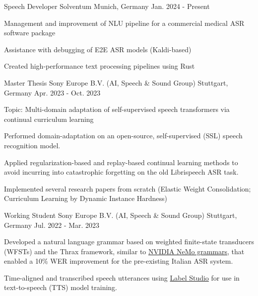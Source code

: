

\begin{cventries}

  \cventry
    {Speech Developer}
    {Solventum} %
    {Munich, Germany} %
    {Jan. 2024 - Present} %
    {
      \begin{cvitems} %
        \item Management and improvement of NLU pipeline for a commercial medical ASR software package
        \item Assistance with debugging of E2E ASR models (Kaldi-based)
        \item Created high-performance text processing pipelines using Rust
      \end{cvitems}
    }
  \cventry
    {Master Thesis}
    {Sony Europe B.V. (AI, Speech \& Sound Group)} %
    {Stuttgart, Germany} %
    {Apr. 2023 - Oct. 2023} %
    {
      \begin{cvitems} %
        \item Topic: Multi-domain adaptation of self-supervised speech transformers via continual curriculum learning %
        \item Performed domain-adaptation on an open-source, self-supervised (SSL) speech recognition model.
        \item Applied regularization-based and replay-based continual learning methods to avoid incurring into catastrophic forgetting on the old Librispeech ASR task.
        \item Implemented several research papers from scratch (Elastic Weight Consolidation; Curriculum Learning by Dynamic Instance Hardness)
      \end{cvitems}
    }

  \cventry
    {Working Student} %
    {Sony Europe B.V. (AI, Speech \& Sound Group)} %
    {Stuttgart, Germany} %
    {Jul. 2022 - Mar. 2023} %
    {
      \begin{cvitems} %
        \item Developed a natural language grammar based on weighted finite-state transducers (WFSTs) and the Thrax framework, similar to \href{https://github.com/NVIDIA/NeMo-text-processing}{NVIDIA NeMo grammars}, that enabled a 10\% WER improvement for the pre-existing Italian ASR system.
        \item Time-aligned and transcribed speech utterances using \href{https://labelstud.io/}{Label Studio} for use in text-to-speech (TTS) model training.
      \end{cvitems}
    }


\end{cventries}
